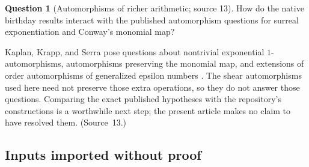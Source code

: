 \documentclass[11pt,letterpaper]{article}
\theoremstyle{definition}
\newtheorem{question}[question]{Question}\aliascntresetthe{question}
\theoremstyle{remark}
\begin{document}
\begin{question}[Automorphisms of richer arithmetic; source 13]\label{hset:sf:q:kks}
How do the native birthday results interact with the published automorphism
questions for surreal exponentiation and Conway's monomial map?
\end{question}

Kaplan, Krapp, and Serra pose questions about nontrivial exponential
$1$-automorphisms, automorphisms preserving the monomial map, and extensions of order
automorphisms of generalized epsilon numbers \cite[Questions 5.4, 5.6, 5.7]{KKS}. The
shear automorphisms used here need not preserve those extra operations, so they do
not answer those questions. Comparing the exact published hypotheses with the
repository's constructions is a worthwhile next step; the present article makes no
claim to have resolved them. (Source~13.)

\subsection{Inputs imported without proof}
\label{hset:sf:sub:imported}
\end{document}

